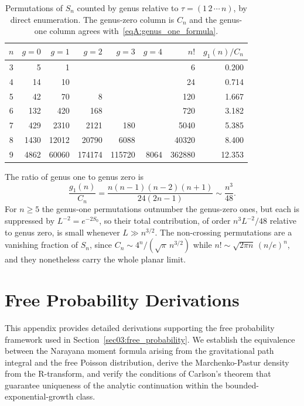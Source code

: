 \documentclass[11pt,letterpaper]{article}
\theoremstyle{plain}
\theoremstyle{definition}
\theoremstyle{remark}
\begin{document}
\begin{table}[ht]
\centering
\caption{Permutations of $S_n$ counted by genus relative to $\tau = (1\,2\,\cdots\,n)$, by direct enumeration. The genus-zero column is $C_n$ and the genus-one column agrees with~\eqref{eqA:genus_one_formula}.}
\label{tabA:comparison}
\begin{tabular}{c|rrrrr|r|r}
\hline
$n$ & $g = 0$ & $g = 1$ & $g = 2$ & $g = 3$ & $g = 4$ & $n!$ & $g_1(n)/C_n$ \\
\hline
3 & 5 & 1 & & & & 6 & 0.200 \\
4 & 14 & 10 & & & & 24 & 0.714 \\
5 & 42 & 70 & 8 & & & 120 & 1.667 \\
6 & 132 & 420 & 168 & & & 720 & 3.182 \\
7 & 429 & 2310 & 2121 & 180 & & 5040 & 5.385 \\
8 & 1430 & 12012 & 20790 & 6088 & & 40320 & 8.400 \\
9 & 4862 & 60060 & 174174 & 115720 & 8064 & 362880 & 12.353 \\
\hline
\end{tabular}
\end{table}

The ratio of genus one to genus zero is
\begin{equation}
\label{eqA:ratio_asymptotic}
\frac{g_1(n)}{C_n} = \frac{n(n-1)(n-2)(n+1)}{24(2n-1)} \sim \frac{n^3}{48} .
\end{equation}
For $n \ge 5$ the genus-one permutations outnumber the genus-zero ones, but each is suppressed by $L^{-2} = e^{-2S_0}$, so their total contribution, of order $n^3 L^{-2}/48$ relative to genus zero, is small whenever $L \gg n^{3/2}$. The non-crossing permutations are a vanishing fraction of $S_n$, since $C_n \sim 4^n/(\sqrt{\pi}\,n^{3/2})$ while $n! \sim \sqrt{2\pi n}\,(n/e)^n$, and they nonetheless carry the whole planar limit.



\section{Free Probability Derivations}
\label{app:free_probability}

This appendix provides detailed derivations supporting the free probability framework used in Section~\ref{sec03:free_probability}. We establish the equivalence between the Narayana moment formula arising from the gravitational path integral and the free Poisson distribution, derive the Marchenko-Pastur density from the R-transform, and verify the conditions of Carlson's theorem that guarantee uniqueness of the analytic continuation within the bounded-exponential-growth class.
\end{document}
